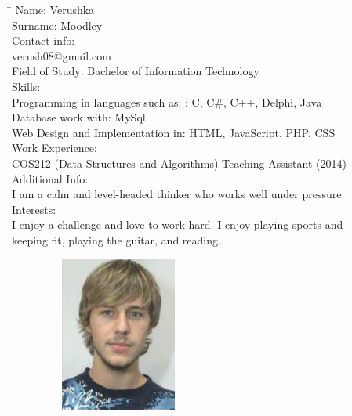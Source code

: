 \documentclass[12pt]{article}
\begin{document}
	\begin{tabbing}
		\hspace*{3.5cm}\=\hspace*{3cm} \kill
		Name: \> Verushka \\
		Surname: \> Moodley \\
		Contact info:  \\
			\>	verush08@gmail.com \\
		Field of Study: \> Bachelor of Information Technology \\
		Skills: \\
			\> Programming in languages such as: : C, C\#, C++, Delphi, Java \\
			\> Database work with: MySql \\
			\> Web Design and Implementation in: HTML, JavaScript, PHP, CSS  \\
		Work Experience: \\
			\> COS212 (Data Structures and Algorithms) Teaching Assistant (2014) \\
		Additional Info: \\
			\>	I am a calm and level-headed thinker who works well under pressure. \\
		Interests:  \\
			\> I enjoy a challenge and love to work hard. I enjoy playing sports and \\ \> keeping fit, playing the guitar, and reading.	
	\end{tabbing}

	\newpage 
	\begin{figure}[ht!]
		\centering
		\includegraphics[width=2in, height=2in]{./Pictures/Eduan.jpg}
	\end{figure}
	
\end{document}
